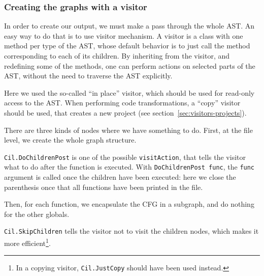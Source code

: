 \subsubsection*{Creating the graphs with a visitor}

In order to create our output, we must make a pass through the whole
AST. An easy way to do that is to use \framac visitor mechanism. A
visitor is a class with one method per type of the AST, whose default
behavior is to just call the method corresponding to each of its
children. By inheriting from the visitor, and redefining some of the
methods, one can perform actions on selected parts of the AST, without
the need to traverse the AST explicitly.


Here we used the so-called ``in place'' visitor, which should be used for
read-only access to the AST. When performing code transformations, a
``copy'' visitor should be used, that creates a new project (see
section~\ref{sec:visitors-projects}).

There are three kinds of nodes where we have something to do. First,
at the file level, we create the whole graph structure.


\texttt{Cil.DoChildrenPost} is one of the possible
\texttt{visitAction}, that tells the visitor what to do after the
function is executed. With \texttt{DoChildrenPost func}, the \texttt{func}
argument is called once the children have been executed: here we close the
parenthesis once that all functions have been printed in the file.

Then, for each function, we encapsulate the CFG in a subgraph, and do
nothing for the other globals.


\texttt{Cil.SkipChildren} tells the visitor not to visit the children
nodes, which makes it more efficient\footnote{In a copying visitor,
\texttt{Cil.JustCopy}
should have been used instead.}.

